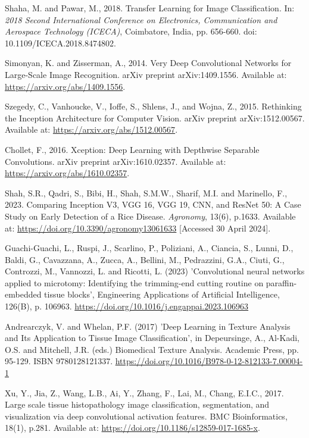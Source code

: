 \begin{thebibliography}{99}
    Shaha, M. and Pawar, M., 2018. Transfer Learning for Image Classification. In: \textit{2018 Second International Conference on Electronics, Communication and Aerospace Technology (ICECA)}, Coimbatore, India, pp. 656-660. doi: 10.1109/ICECA.2018.8474802.

    Simonyan, K. and Zisserman, A., 2014. Very Deep Convolutional Networks for Large-Scale Image Recognition. arXiv preprint arXiv:1409.1556. Available at: \url{https://arxiv.org/abs/1409.1556}.
    
    Szegedy, C., Vanhoucke, V., Ioffe, S., Shlens, J., and Wojna, Z., 2015. Rethinking the Inception Architecture for Computer Vision. arXiv preprint arXiv:1512.00567. Available at: \url{https://arxiv.org/abs/1512.00567}.
    
    Chollet, F., 2016. Xception: Deep Learning with Depthwise Separable Convolutions. arXiv preprint arXiv:1610.02357. Available at: \url{https://arxiv.org/abs/1610.02357}.

    Shah, S.R., Qadri, S., Bibi, H., Shah, S.M.W., Sharif, M.I. and Marinello, F., 2023. Comparing Inception V3, VGG 16, VGG 19, CNN, and ResNet 50: A Case Study on Early Detection of a Rice Disease. \textit{Agronomy}, 13(6), p.1633. Available at: \url{https://doi.org/10.3390/agronomy13061633} [Accessed 30 April 2024].

    Guachi-Guachi, L., Ruspi, J., Scarlino, P., Poliziani, A., Ciancia, S., Lunni, D., Baldi, G., Cavazzana, A., Zucca, A., Bellini, M., Pedrazzini, G.A., Ciuti, G., Controzzi, M., Vannozzi, L. and Ricotti, L. (2023) 'Convolutional neural networks applied to microtomy: Identifying the trimming-end cutting routine on paraffin-embedded tissue blocks', Engineering Applications of Artificial Intelligence, 126(B), p. 106963. \url{https://doi.org/10.1016/j.engappai.2023.106963}

    Andrearczyk, V. and Whelan, P.F. (2017) 'Deep Learning in Texture Analysis and Its Application to Tissue Image Classification', in Depeursinge, A., Al-Kadi, O.S. and Mitchell, J.R. (eds.) Biomedical Texture Analysis. Academic Press, pp. 95-129. ISBN 9780128121337. \url{https://doi.org/10.1016/B978-0-12-812133-7.00004-1}

    Xu, Y., Jia, Z., Wang, L.B., Ai, Y., Zhang, F., Lai, M., Chang, E.I.C., 2017. Large scale tissue histopathology image classification, segmentation, and visualization via deep convolutional activation features. BMC Bioinformatics, 18(1), p.281. Available at: \url{https://doi.org/10.1186/s12859-017-1685-x}.
    

\end{thebibliography}
